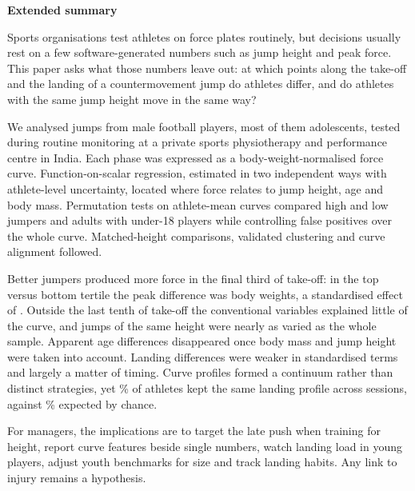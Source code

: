 \noindent\textbf{Extended summary}\par\smallskip
\noindent Sports organisations test athletes on force plates routinely, but decisions usually rest on a few software-generated numbers such as jump height and peak force. This paper asks what those numbers leave out: at which points along the take-off and the landing of a countermovement jump do athletes differ, and do athletes with the same jump height move in the same way?

We analysed \nTrials{} jumps from \nAth{} male football players, most of them adolescents, tested during routine monitoring at a private sports physiotherapy and performance centre in India. Each phase was expressed as a body-weight-normalised force curve. Function-on-scalar regression, estimated in two independent ways with athlete-level uncertainty, located where force relates to jump height, age and body mass. Permutation tests on athlete-mean curves compared high and low jumpers and adults with under-18 players while controlling false positives over the whole curve. Matched-height comparisons, validated clustering and curve alignment followed.

Better jumpers produced more force in the final third of take-off: in the top versus bottom tertile the peak difference was \tertToD{} body weights, a standardised effect of \tertToG. Outside the last tenth of take-off the conventional variables explained little of the curve, and jumps of the same height were nearly as varied as the whole sample. Apparent age differences disappeared once body mass and jump height were taken into account. Landing differences were weaker in standardised terms and largely a matter of timing. Curve profiles formed a continuum rather than distinct strategies, yet \stabLd\% of athletes kept the same landing profile across sessions, against \chanceLd\% expected by chance.

For managers, the implications are to target the late push when training for height, report curve features beside single numbers, watch landing load in young players, adjust youth benchmarks for size and track landing habits. Any link to injury remains a hypothesis.
